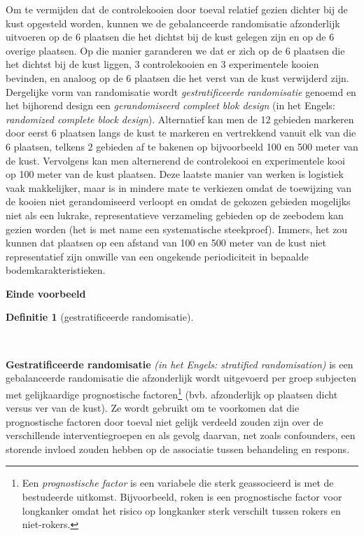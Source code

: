 \documentclass[
  dutch,
  letterpaper,
  12pt]{book}
\theoremstyle{definition}
\theoremstyle{definition}
\newtheorem{definition}{Definitie}[chapter]
\theoremstyle{definition}
\theoremstyle{remark}
\begin{document}
Om te vermijden dat de controlekooien door toeval relatief gezien
dichter bij de kust opgesteld worden, kunnen we de gebalanceerde
randomisatie afzonderlijk uitvoeren op de 6 plaatsen die het dichtst bij
de kust gelegen zijn en op de 6 overige plaatsen. Op die manier
garanderen we dat er zich op de 6 plaatsen die het dichtst bij de kust
liggen, 3 controlekooien en 3 experimentele kooien bevinden, en analoog
op de 6 plaatsen die het verst van de kust verwijderd zijn. Dergelijke
vorm van randomisatie wordt \emph{gestratificeerde randomisatie} genoemd
en het bijhorend design een \emph{gerandomiseerd compleet blok design}
(in het Engels: \emph{randomized complete block design}). Alternatief
kan men de 12 gebieden markeren door eerst 6 plaatsen langs de kust te
markeren en vertrekkend vanuit elk van die 6 plaatsen, telkens 2
gebieden af te bakenen op bijvoorbeeld 100 en 500 meter van de kust.
Vervolgens kan men alternerend de controlekooi en experimentele kooi op
100 meter van de kust plaatsen. Deze laatste manier van werken is
logistiek vaak makkelijker, maar is in mindere mate te verkiezen omdat
de toewijzing van de kooien niet gerandomiseerd verloopt en omdat de
gekozen gebieden mogelijks niet als een lukrake, representatieve
verzameling gebieden op de zeebodem kan gezien worden (het is met name
een systematische steekproef). Immers, het zou kunnen dat plaatsen op
een afstand van 100 en 500 meter van de kust niet representatief zijn
omwille van een ongekende periodiciteit in bepaalde
bodemkarakteristieken.

\textbf{Einde voorbeeld}

\begin{definition}[gestratificeerde
randomisatie]\protect\hypertarget{def-gestratificeerde-randomisatie}{}\label{def-gestratificeerde-randomisatie}

~

\end{definition}

\textbf{Gestratificeerde randomisatie} \emph{(in het Engels: stratified
randomisation)} is een gebalanceerde randomisatie die afzonderlijk wordt
uitgevoerd per groep subjecten met gelijkaardige prognostische
factoren\footnote{Een \emph{prognostische factor} is een variabele die
  sterk geassocieerd is met de bestudeerde uitkomst. Bijvoorbeeld, roken
  is een prognostische factor voor longkanker omdat het risico op
  longkanker sterk verschilt tussen rokers en niet-rokers.} (bvb.
afzonderlijk op plaatsen dicht versus ver van de kust). Ze wordt
gebruikt om te voorkomen dat die prognostische factoren door toeval niet
gelijk verdeeld zouden zijn over de verschillende interventiegroepen en
als gevolg daarvan, net zoals confounders, een storende invloed zouden
hebben op de associatie tussen behandeling en respons.
\end{document}
